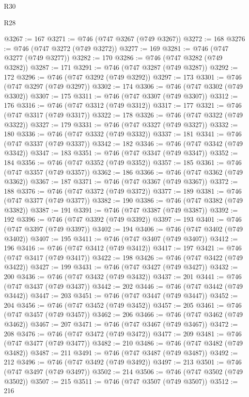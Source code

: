 \begin{lexlean}{R30}
\begin{lexlean}{R28}
\begin{coremodule}
{{{{{{{{{{{{{{{{{{{{{{{{{{{{{{{{{{{{{{{{{{{{{{{{{{{{{{{{{{{{{{{{{{{{{{{{{{{{{{{{{{{{{{{{{{{{{{{{{{{{{{{{{{{{{{{{{{{{{{{{{{{{{{{{{{{{{{{{{{{{{{{@3267 := 167
@3271 := @746 (@747 @3267 (@749 @3267))
@3272 := 168
@3276 := @746 (@747 @3272 (@749 @3272))
@3277 := 169
@3281 := @746 (@747 @3277 (@749 @3277))
@3282 := 170
@3286 := @746 (@747 @3282 (@749 @3282))
@3287 := 171
@3291 := @746 (@747 @3287 (@749 @3287))
@3292 := 172
@3296 := @746 (@747 @3292 (@749 @3292))
@3297 := 173
@3301 := @746 (@747 @3297 (@749 @3297))
@3302 := 174
@3306 := @746 (@747 @3302 (@749 @3302))
@3307 := 175
@3311 := @746 (@747 @3307 (@749 @3307))
@3312 := 176
@3316 := @746 (@747 @3312 (@749 @3312))
@3317 := 177
@3321 := @746 (@747 @3317 (@749 @3317))
@3322 := 178
@3326 := @746 (@747 @3322 (@749 @3322))
@3327 := 179
@3331 := @746 (@747 @3327 (@749 @3327))
@3332 := 180
@3336 := @746 (@747 @3332 (@749 @3332))
@3337 := 181
@3341 := @746 (@747 @3337 (@749 @3337))
@3342 := 182
@3346 := @746 (@747 @3342 (@749 @3342))
@3347 := 183
@3351 := @746 (@747 @3347 (@749 @3347))
@3352 := 184
@3356 := @746 (@747 @3352 (@749 @3352))
@3357 := 185
@3361 := @746 (@747 @3357 (@749 @3357))
@3362 := 186
@3366 := @746 (@747 @3362 (@749 @3362))
@3367 := 187
@3371 := @746 (@747 @3367 (@749 @3367))
@3372 := 188
@3376 := @746 (@747 @3372 (@749 @3372))
@3377 := 189
@3381 := @746 (@747 @3377 (@749 @3377))
@3382 := 190
@3386 := @746 (@747 @3382 (@749 @3382))
@3387 := 191
@3391 := @746 (@747 @3387 (@749 @3387))
@3392 := 192
@3396 := @746 (@747 @3392 (@749 @3392))
@3397 := 193
@3401 := @746 (@747 @3397 (@749 @3397))
@3402 := 194
@3406 := @746 (@747 @3402 (@749 @3402))
@3407 := 195
@3411 := @746 (@747 @3407 (@749 @3407))
@3412 := 196
@3416 := @746 (@747 @3412 (@749 @3412))
@3417 := 197
@3421 := @746 (@747 @3417 (@749 @3417))
@3422 := 198
@3426 := @746 (@747 @3422 (@749 @3422))
@3427 := 199
@3431 := @746 (@747 @3427 (@749 @3427))
@3432 := 200
@3436 := @746 (@747 @3432 (@749 @3432))
@3437 := 201
@3441 := @746 (@747 @3437 (@749 @3437))
@3442 := 202
@3446 := @746 (@747 @3442 (@749 @3442))
@3447 := 203
@3451 := @746 (@747 @3447 (@749 @3447))
@3452 := 204
@3456 := @746 (@747 @3452 (@749 @3452))
@3457 := 205
@3461 := @746 (@747 @3457 (@749 @3457))
@3462 := 206
@3466 := @746 (@747 @3462 (@749 @3462))
@3467 := 207
@3471 := @746 (@747 @3467 (@749 @3467))
@3472 := 208
@3476 := @746 (@747 @3472 (@749 @3472))
@3477 := 209
@3481 := @746 (@747 @3477 (@749 @3477))
@3482 := 210
@3486 := @746 (@747 @3482 (@749 @3482))
@3487 := 211
@3491 := @746 (@747 @3487 (@749 @3487))
@3492 := 212
@3496 := @746 (@747 @3492 (@749 @3492))
@3497 := 213
@3501 := @746 (@747 @3497 (@749 @3497))
@3502 := 214
@3506 := @746 (@747 @3502 (@749 @3502))
@3507 := 215
@3511 := @746 (@747 @3507 (@749 @3507))
@3512 := 216
}}}}}}}}}}}}}}}}}}}}}}}}}}}}}}}}}}}}}}}}}}}}}}}}}}}}}}}}}}}}}}}}}}}}}}}}}}}}}}}}}}}}}}}}}}}}}}}}}}}}}}}}}}}}}}}}}}}}}}}}}}}}}}}}}}}}}}}}}}}}}}}
\end{coremodule}
\end{lexlean}
\end{lexlean}
